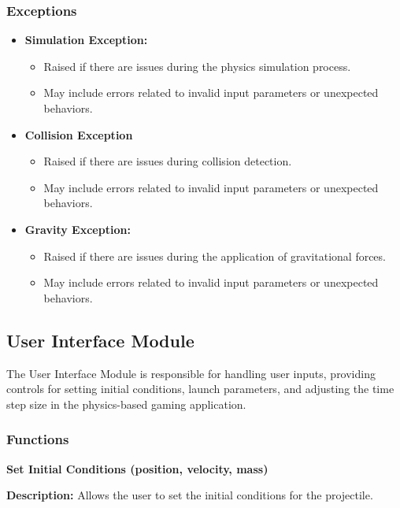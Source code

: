\documentclass[12pt, titlepage]{article}
\begin{document}
\subsubsection{Exceptions}
\begin{itemize}
  \item \textbf{Simulation Exception:}
    \begin{itemize}
        \item Raised if there are issues during the physics simulation process.
     \item May include errors related to invalid input parameters or unexpected behaviors.
    \end{itemize}

\item \textbf{Collision Exception}
\begin{itemize}
  \item Raised if there are issues during collision detection.
  \item May include errors related to invalid input parameters or unexpected behaviors.
\end{itemize}
\item \textbf{Gravity Exception:}
\begin{itemize}
  \item Raised if there are issues during the application of gravitational forces.
  \item May include errors related to invalid input parameters or unexpected behaviors.
\end{itemize}
\end{itemize}

\subsection{User Interface Module}
The User Interface Module is responsible for handling user inputs, providing controls for setting initial conditions, launch parameters, and adjusting the time step size in the physics-based gaming application.

\subsubsection{Functions}

\textbf{Set Initial Conditions (position, velocity, mass)}

\textbf{Description:} Allows the user to set the initial conditions for the projectile.
\end{document}
